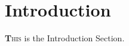 \doublespacing
{}

\chapter{Introduction}

\lettrine[lines=3]{\textbf{T}}{his} is the Introduction Section.


